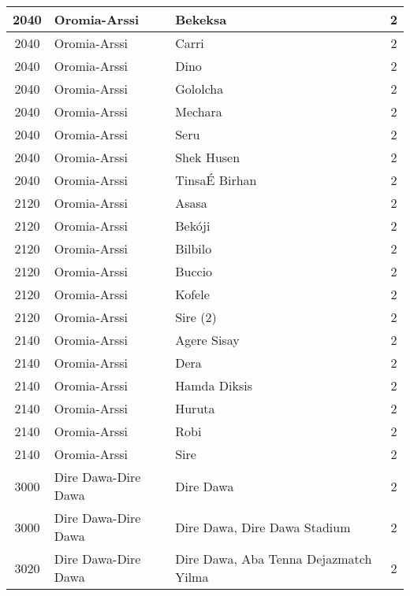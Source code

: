 \documentclass[12pt,a4paper]{report}
\begin{document}
\begin{tabular}{|c|l|l|c|}
\hline 
\rule[-1ex]{0pt}{2.5ex} 2040 & Oromia-Arssi & Bekeksa & 2 \\ 
\hline 
\rule[-1ex]{0pt}{2.5ex} 2040 & Oromia-Arssi & Carri & 2 \\ 
\hline 
\rule[-1ex]{0pt}{2.5ex} 2040 & Oromia-Arssi & Dino & 2 \\ 
\hline 
\rule[-1ex]{0pt}{2.5ex} 2040 & Oromia-Arssi & Gololcha & 2 \\ 
\hline 
\rule[-1ex]{0pt}{2.5ex} 2040 & Oromia-Arssi & Mechara & 2 \\ 
\hline 
\rule[-1ex]{0pt}{2.5ex} 2040 & Oromia-Arssi & Seru & 2 \\ 
\hline 
\rule[-1ex]{0pt}{2.5ex} 2040 & Oromia-Arssi & Shek Husen & 2 \\ 
\hline 
\rule[-1ex]{0pt}{2.5ex} 2040 & Oromia-Arssi & Tinsa\'E Birhan & 2 \\ 
\hline 
\rule[-1ex]{0pt}{2.5ex} 2120 & Oromia-Arssi & Asasa & 2 \\ 
\hline 
\rule[-1ex]{0pt}{2.5ex} 2120 & Oromia-Arssi & Bek\'oji & 2 \\ 
\hline 
\rule[-1ex]{0pt}{2.5ex} 2120 & Oromia-Arssi & Bilbilo & 2 \\ 
\hline 
\rule[-1ex]{0pt}{2.5ex} 2120 & Oromia-Arssi & Buccio & 2 \\ 
\hline 
\rule[-1ex]{0pt}{2.5ex} 2120 & Oromia-Arssi & Kofele & 2 \\  
\hline 
\rule[-1ex]{0pt}{2.5ex} 2120 & Oromia-Arssi & Sire (2) & 2 \\ 
\hline 
\rule[-1ex]{0pt}{2.5ex} 2140 & Oromia-Arssi & Agere Sisay & 2 \\ 
\hline 
\rule[-1ex]{0pt}{2.5ex} 2140 & Oromia-Arssi & Dera & 2 \\ 
\hline 
\rule[-1ex]{0pt}{2.5ex} 2140 & Oromia-Arssi & Hamda Diksis & 2 \\ 
\hline 
\rule[-1ex]{0pt}{2.5ex} 2140 & Oromia-Arssi & Huruta & 2 \\ 
\hline 
\rule[-1ex]{0pt}{2.5ex} 2140 & Oromia-Arssi & Robi & 2 \\ 
\hline 
\rule[-1ex]{0pt}{2.5ex} 2140 & Oromia-Arssi & Sire & 2 \\ 
\hline 
\rule[-1ex]{0pt}{2.5ex} 3000 & Dire Dawa-Dire Dawa & Dire Dawa & 2 \\
\hline 
\rule[-1ex]{0pt}{2.5ex} 3000 & Dire Dawa-Dire Dawa & Dire Dawa, Dire Dawa Stadium & 2 \\
\hline 
\rule[-1ex]{0pt}{2.5ex} 3020 & Dire Dawa-Dire Dawa & Dire Dawa, Aba Tenna Dejazmatch Yilma & 2 \\

\end{tabular}
\end{document}

